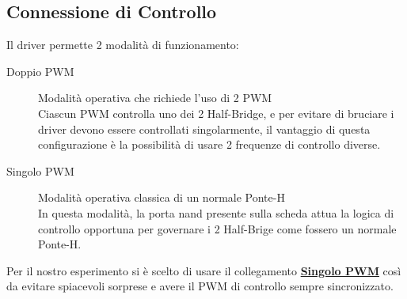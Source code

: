 \subsection{Connessione di Controllo}
Il driver permette 2 modalità di funzionamento:
\begin{description}
	\item[Doppio PWM] Modalità operativa che richiede l'uso di 2 PWM\\
	      Ciascun PWM controlla uno dei 2 Half-Bridge, e per evitare di bruciare i driver devono essere controllati singolarmente, il vantaggio di questa configurazione è la possibilità di usare 2 frequenze di controllo diverse.
	\item[Singolo PWM] Modalità operativa classica di un normale Ponte-H\\
	      In questa modalità, la porta nand presente sulla scheda attua la logica di controllo opportuna per governare i 2 Half-Brige come fossero un normale Ponte-H.
\end{description}

\noindent
Per il nostro esperimento si è scelto di usare il collegamento \textbf{\underline{Singolo PWM}} così da evitare spiacevoli sorprese e avere il PWM di controllo sempre sincronizzato.	

\newpage
